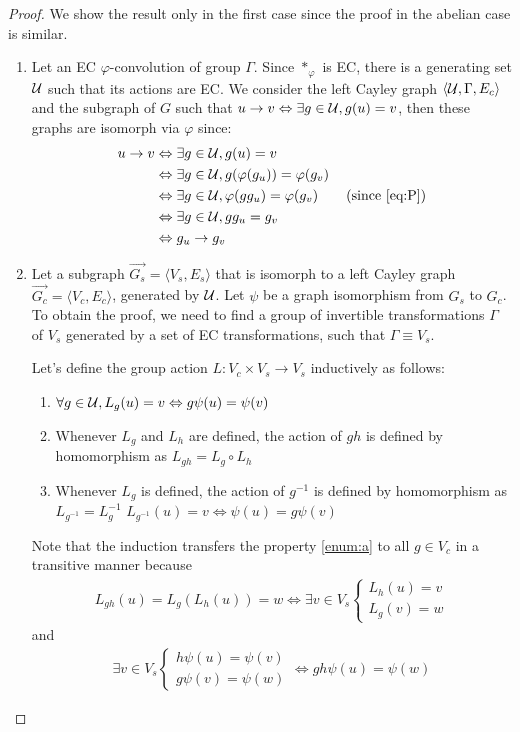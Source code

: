 \begin{proof}
We show the result only in the first case since the proof in the abelian case is similar.
\begin{enumerate}
	\item Let an EC $\varphi$-convolution of group $\Gamma$. Since $\ast_\varphi$ is EC, there is a generating set $\mathcal{U}$ such that its actions are EC. We consider the left Cayley graph $\langle \mathcal{U}, \Gamma, E_c \rangle$ and the subgraph of $G$ such that $u \to v \Leftrightarrow \exists g \in \mathcal{U}, g(u) = v$, then these graphs are isomorph via $\varphi$ since:
  \begin{align*}
  u \to v & \Leftrightarrow \exists g \in \cu, g(u) = v\\
          & \Leftrightarrow \exists g \in \cu, g(\varphi(g_u)) = \varphi(g_v)\\
          & \Leftrightarrow \exists g \in \cu, \varphi(gg_u) = \varphi(g_v) \tag{since \eqref{eq:P}}\\
          & \Leftrightarrow \exists g \in \cu, gg_u = g_v\\
          & \Leftrightarrow g_u \to g_v
  \end{align*}

	\item Let a subgraph $\vec{G_s} = \langle V_s, E_s \rangle$ that is isomorph to a left Cayley graph $\vec{G_c} = \langle V_c, E_c \rangle$, generated by $\mathcal{U}$. Let $\psi$ be a graph isomorphism from $G_s$ to $G_c$. To obtain the proof, we need to find a group of invertible transformations $\Gamma$ of $V_s$ generated by a set of EC transformations, such that $\Gamma \equiv V_s$.

Let's define the group action $L : V_c \times V_s \rightarrow V_s$ inductively as follows:
\begin{enumerate}[label=(\alph*)]
  \item $\forall g \in \mathcal{U}, L_g(u) = v \Leftrightarrow g\psi(u) = \psi(v)$ \label{enum:a}
  \item Whenever $L_g$ and $L_h$ are defined, the action of $gh$ is defined by homomorphism as $L_{gh}= L_g \circ L_h$ \label{enum:b}
  \item Whenever $L_g$ is defined, the action of $g^{-1}$ is defined by homomorphism as $L_{g^{-1}}=L_g^{-1}$ \ie $L_{g^{-1}}(u) = v \Leftrightarrow \psi(u) = g\psi(v)$ \label{enum:c}
\end{enumerate}

Note that the induction transfers the property \ref{enum:a} to all $g \in V_c$ in a transitive manner because
\begin{gather*}
L_{gh}(u) = L_g(L_h(u)) = w \Leftrightarrow \exists v \in V_s
\begin{cases}
L_h(u) = v\\
L_g(v) = w
\end{cases}
\end{gather*}
and
\begin{gather*}
\exists v \in V_s
\begin{cases}
h\psi(u) = \psi(v)\\
g\psi(v) = \psi(w)
\end{cases}
\Leftrightarrow gh\psi(u) = \psi(w)
\end{gather*}


\end{enumerate}
\end{proof}

